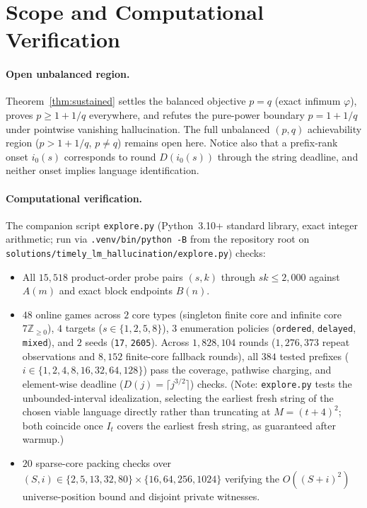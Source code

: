 \documentclass[11pt]{article}
\theoremstyle{plain}
\theoremstyle{definition}
\theoremstyle{remark}
\begin{document}
\section{Scope and Computational Verification}

\paragraph{Open unbalanced region.}
Theorem~\ref{thm:sustained} settles the balanced objective $p = q$ (exact infimum $\varphi$), proves $p \ge 1 + 1/q$ everywhere, and refutes the pure-power boundary $p = 1 + 1/q$ under pointwise vanishing hallucination.
The full unbalanced $(p, q)$ achievability region ($p > 1 + 1/q$, $p \neq q$) remains open here.
Notice also that a prefix-rank onset $i_0(s)$ corresponds to round $D(i_0(s))$ through the string deadline, and neither onset implies language identification.

\paragraph{Computational verification.}
The companion script \texttt{explore.py} (Python~3.10+ standard library, exact integer arithmetic; run via \texttt{.venv/bin/python -B} from the repository root on \texttt{solutions/\allowbreak timely\_\allowbreak lm\_\allowbreak hallucination/\allowbreak explore.py}) checks:
\begin{itemize}[leftmargin=2em,itemsep=1pt,topsep=3pt]
\item All $15{,}518$ product-order probe pairs $(s, k)$ through $sk \le 2{,}000$ against $A(m)$ and exact block endpoints $B(n)$.
\item $48$ online games across $2$ core types (singleton finite core and infinite core $7\mathbb{Z}_{\ge 0}$), $4$ targets ($s \in \{1, 2, 5, 8\}$), $3$ enumeration policies (\texttt{ordered}, \texttt{delayed}, \texttt{mixed}), and $2$ seeds (\texttt{17}, \texttt{2605}). Across $1{,}828{,}104$ rounds ($1{,}276{,}373$ repeat observations and $8{,}152$ finite-core fallback rounds), all $384$ tested prefixes ($i \in \{1, 2, 4, 8, 16, 32, 64, 128\}$) pass the coverage, pathwise charging, and element-wise deadline ($D(j) = \lceil j^{3/2} \rceil$) checks. (Note: \texttt{explore.py} tests the unbounded-interval idealization, selecting the earliest fresh string of the chosen viable language directly rather than truncating at $M = (t + 4)^2$; both coincide once $I_t$ covers the earliest fresh string, as guaranteed after warmup.)
\item $20$ sparse-core packing checks over $(S, i) \in \{2, 5, 13, 32, 80\} \times \{16, 64, 256, 1024\}$ verifying the $O((S+i)^2)$ universe-position bound and disjoint private witnesses.
\end{itemize}
\end{document}
